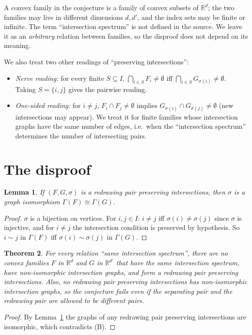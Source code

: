 \documentclass[11pt]{article}
\newtheorem{theorem}{Theorem}
\newtheorem{lemma}[theorem]{Lemma}
\theoremstyle{definition}
\theoremstyle{remark}
\renewcommand{\_}{\oldus\allowbreak}
\begin{document}
A convex family in the conjecture is a family of convex subsets of $\mathbb{R}^d$; the two families
may live in different dimensions $d,d'$, and the index sets may be finite or infinite. The term
``intersection spectrum'' is not defined in the source. We leave it as an \emph{arbitrary}
relation between families, so the disproof does not depend on its meaning.

We also treat two other readings of ``preserving intersections'':
\begin{itemize}
\item \emph{Nerve reading:} for every finite $S\subseteq I$, $\bigcap_{i\in S}F_i\neq\emptyset$ iff
$\bigcap_{i\in S}G_{\sigma(i)}\neq\emptyset$. Taking $S=\{i,j\}$ gives the pairwise reading.
\item \emph{One-sided reading:} for $i\neq j$, $F_i\cap F_j\neq\emptyset$ implies
$G_{\sigma(i)}\cap G_{\sigma(j)}\neq\emptyset$ (new intersections may appear). We treat it for finite
families whose intersection graphs have the same number of edges, i.e.\ when the ``intersection
spectrum'' determines the number of intersecting pairs.
\end{itemize}

\section{The disproof}

\begin{lemma}\label{lem:iso}
If $(F,G,\sigma)$ is a redrawing pair preserving intersections, then $\sigma$ is a graph isomorphism
$\Gamma(F)\cong\Gamma(G)$.
\end{lemma}
\begin{proof}
$\sigma$ is a bijection on vertices. For $i,j\in I$: $i\neq j$ iff $\sigma(i)\neq\sigma(j)$ since
$\sigma$ is injective, and for $i\neq j$ the intersection condition is preserved by hypothesis. So
$i\sim j$ in $\Gamma(F)$ iff $\sigma(i)\sim\sigma(j)$ in $\Gamma(G)$.
\end{proof}

\begin{theorem}\label{thm:main}
For every relation ``same intersection spectrum'', there are no convex families $F$ in
$\mathbb{R}^d$ and $G$ in $\mathbb{R}^{d'}$ that have the same intersection spectrum, have
non-isomorphic intersection graphs, and form a redrawing pair preserving intersections. Also, no
redrawing pair preserving intersections has non-isomorphic intersection graphs, so the conjecture
fails even if the separating pair and the redrawing pair are allowed to be different pairs.
\end{theorem}
\begin{proof}
By Lemma~\ref{lem:iso} the graphs of any redrawing pair preserving intersections are isomorphic,
which contradicts (B).
\end{proof}
\end{document}
